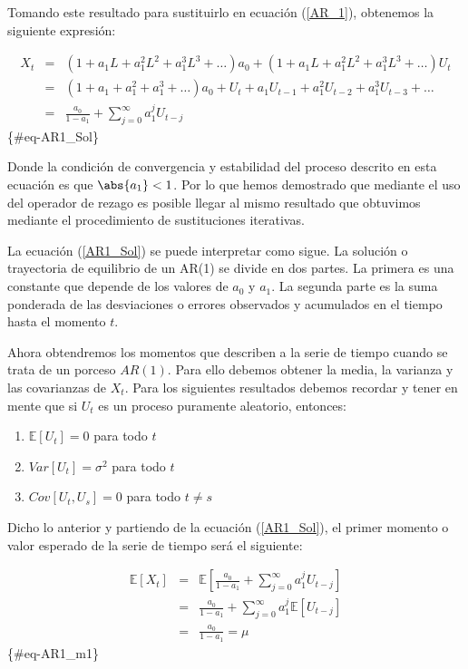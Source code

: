 \documentclass[
  a4paper,
]{article}
\providecommand{\tightlist}{%
  \setlength{\itemsep}{0pt}\setlength{\parskip}{0pt}}\usepackage{longtable,booktabs,array}
\begin{document}
Tomando este resultado para sustituirlo en ecuación (\ref{AR_1}),
obtenemos la siguiente expresión:

\begin{eqnarray}
X_t & = & (1 + a_1 L + a_1^2 L^2 + a_1^3 L^3 + \ldots) a_0 + (1 + a_1 L + a_1^2 L^2 + a_1^3 L^3 + \ldots) U_t \nonumber \\
    & = & (1 + a_1 + a_1^2 + a_1^3 + \ldots) a_0 + U_t + a_1 U_{t-1} + a_1^2 U_{t-2} + a_1^3 U_{t-3} + \ldots \nonumber \\
    & = & \frac{a_0}{1 - a_1} + \sum^{\infty}_{j = 0} a_1^j U_{t-j}
\end{eqnarray} \{\#eq-AR1\_Sol\}

Donde la condición de convergencia y estabilidad del proceso descrito en
esta ecuación es que \(\abs{a_1} < 1\). Por lo que hemos demostrado que
mediante el uso del operador de rezago es posible llegar al mismo
resultado que obtuvimos mediante el procedimiento de sustituciones
iterativas.

La ecuación (\ref{AR1_Sol}) se puede interpretar como sigue. La solución
o trayectoria de equilibrio de un AR(1) se divide en dos partes. La
primera es una constante que depende de los valores de \(a_0\) y
\(a_1\). La segunda parte es la suma ponderada de las desviaciones o
errores observados y acumulados en el tiempo hasta el momento \(t\).

Ahora obtendremos los momentos que describen a la serie de tiempo cuando
se trata de un porceso \(AR(1)\). Para ello debemos obtener la media, la
varianza y las covarianzas de \(X_t\). Para los siguientes resultados
debemos recordar y tener en mente que si \(U_t\) es un proceso puramente
aleatorio, entonces:

\begin{enumerate}
\def\labelenumi{\arabic{enumi}.}
\tightlist
\item
  \(\mathbb{E}[U_t] = 0\) para todo \(t\)
\item
  \(Var[U_t] = \sigma^2\) para todo \(t\)
\item
  \(Cov[U_t, U_s] = 0\) para todo \(t \neq s\)
\end{enumerate}

Dicho lo anterior y partiendo de la ecuación (\ref{AR1_Sol}), el primer
momento o valor esperado de la serie de tiempo será el siguiente:

\begin{eqnarray}
\mathbb{E}[X_t] & = & \mathbb{E} \left[ \frac{a_0}{1 - a_1} + \sum^{\infty}_{j = 0} a_1^j U_{t-j} \right] \nonumber \\
    & = & \frac{a_0}{1 - a_1} + \sum^{\infty}_{j = 0} a_1^j \mathbb{E}[U_{t-j}] \nonumber \\
    & = & \frac{a_0}{1 - a_1} = \mu
\end{eqnarray} \{\#eq-AR1\_m1\}
\end{document}
